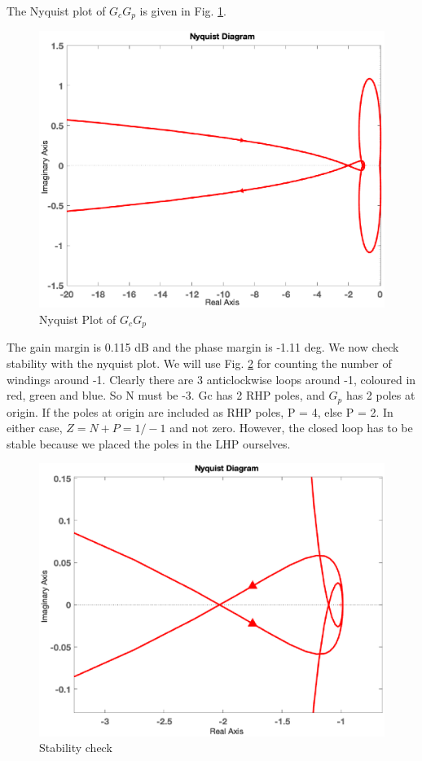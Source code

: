 \documentclass[12pt]{article}
\begin{document}
The Nyquist plot of $G_cG_p$ is given in Fig. \ref{fig:prb_4a}. 
\begin{figure}[h!]
    \centering
    \includegraphics[scale=0.6]{figs/8.2-1.eps}
    \caption{Nyquist Plot of $G_cG_p$}
    \label{fig:prb_4a}
\end{figure}

 The gain margin is 0.115 dB and the phase margin is -1.11 deg. We now check stability with the nyquist plot. We will use Fig. \ref{fig:prb_4b} for counting the number of windings around -1. Clearly there are 3 anticlockwise loops around -1, coloured in red, green and blue. So N must be -3. Gc has 2 RHP poles, and $G_p$ has 2 poles at origin. If the poles at origin are included as RHP poles, P = 4, else P = 2. In either case, $Z = N + P = 1/ -1$ and not zero. However, the closed loop has to be stable because we placed the poles in the LHP ourselves. 

 \begin{figure}[h!]
    \centering
    \includegraphics[scale=0.6]{figs/8.2-2.eps}
    \caption{Stability check}
    \label{fig:prb_4b}
\end{figure}
\end{document}
